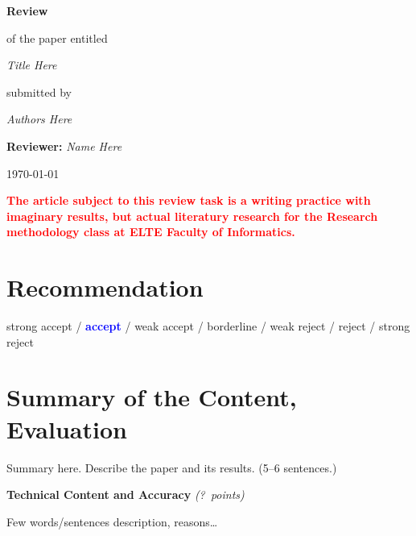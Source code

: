 \documentclass[a4paper,12pt]{article}
\begin{document}
\setcounter{secnumdepth}{0}
\setlength{\parindent}{0cm}

\newcommand{\score}[1]{\hfill\textit{(#1~points)}}
\newcommand{\select}[1]{{\Large\textbf{\textcolor{blue}{#1}}}}




\begin{center}
{\LARGE \textbf{Review}}
\bigskip

of the paper entitled
\medskip

{\large \textit{Title Here}}
\medskip

submitted by
\medskip

{\large \textit{Authors Here}}

\bigskip

{\large \textbf{Reviewer:} \textit{Name Here}}
\medskip

\today

\end{center}

\vspace{1cm}


{\footnotesize\textcolor{red}{\textbf{The article subject to this review task is a writing practice with imaginary results, but actual literatury research for the Research methodology class at ELTE Faculty of Informatics.}}}



\section{Recommendation}

strong accept / \select{accept} / weak accept / borderline / weak reject / reject / strong reject


\section{Summary of the Content, Evaluation}

Summary here. Describe the paper and its results. (5--6 sentences.)
\bigskip


\textbf{Technical Content and Accuracy}
\score{?}

Few words/sentences description, reasons\dots %
\bigskip
\end{document}
